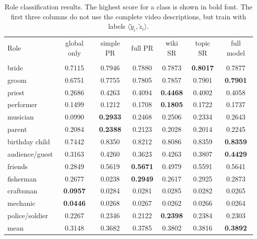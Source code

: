 \documentclass[10pt,twocolumn,letterpaper]{article}
\begin{document}
\setlength{\tabcolsep}{2.5pt}
\begin{table}
\begin{center}
\scalebox{0.9}
{\footnotesize
\begin{tabular}{|l|c|c|c|c|c|c|}
\hline
{Role} & global only & simple PR & full PR & wiki SR & topic SR & full model \\
& & & & \cite{Rohrbach_CVPR10} & & \\
  \hline \hline
bride & 0.7115 & 0.7946 & 0.7880 & 0.7873 & \textbf{0.8017} & 0.7877 \\ 
groom & 0.6751 & 0.7755 & 0.7805 & 0.7857 & 0.7901 & \textbf{0.7901} \\ 
priest & 0.2686 & 0.4263 & 0.4094 & \textbf{0.4468} & 0.4002 & 0.4058 \\ 
performer & 0.1499 & 0.1212 & 0.1708 & \textbf{0.1805} & 0.1722 & 0.1737 \\ 
musician & 0.0990 & \textbf{0.2933} & 0.2468 & 0.2506 & 0.2334 & 0.2643 \\ 
parent & 0.2084 & \textbf{0.2388} & 0.2123 & 0.2028 & 0.2014 & 0.2245 \\ 
birthday child & 0.7442 & 0.8350 & 0.8212 & 0.8086 & 0.8359 & \textbf{0.8359} \\ 
audience/guest & 0.3163 & 0.4260 & 0.3623 & 0.4263 & 0.3807 & \textbf{0.4429} \\ 
friends & 0.2849 & 0.5619 & \textbf{0.5671} & 0.4979 & 0.5591 & 0.5641 \\ 
fisherman & 0.2677 & 0.0238 & \textbf{0.2949} & 0.2617 & 0.2925 & 0.2873 \\ 
craftsman & \textbf{0.0957} & 0.0284 & 0.0281 & 0.0285 & 0.0282 & 0.0265 \\ 
mechanic & \textbf{0.0446} & 0.0268 & 0.0267 & 0.0262 & 0.0266 & 0.0264 \\ 
police/soldier & 0.2267 & 0.2346 & 0.2122 & \textbf{0.2398} & 0.2384 & 0.2303 \\ 
\hline \hline
mean & 0.3148  &  0.3682  &  0.3785  &  0.3802  &  0.3816 &  \textbf{0.3892}\\
\hline
\end{tabular}
}
\end{center}
\caption{Role classification results. The highest score for a class is shown in bold font. The first three columns do not use the complete video descriptions, but train with labels $\langle \tilde{y}_i, \tilde{z}_i \rangle$.}
\label{tab:results_role}
\end{table}
\setlength{\tabcolsep}{1.4pt}
\end{document}
